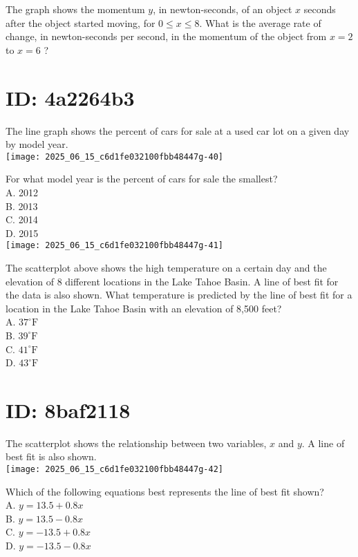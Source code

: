 The graph shows the momentum $y$, in newton-seconds, of an object $x$ seconds after the object started moving, for $0 \leq x \leq 8$. What is the average rate of change, in newton-seconds per second, in the momentum of the object from $x=2$ to $x=6$ ?

\section*{ID: 4a2264b3}
The line graph shows the percent of cars for sale at a used car lot on a given day by model year.\\
\texttt{[image: 2025\_06\_15\_c6d1fe032100fbb48447g-40]}

For what model year is the percent of cars for sale the smallest?\\
A. 2012\\
B. 2013\\
C. 2014\\
D. 2015\\
\texttt{[image: 2025\_06\_15\_c6d1fe032100fbb48447g-41]}

The scatterplot above shows the high temperature on a certain day and the elevation of 8 different locations in the Lake Tahoe Basin. A line of best fit for the data is also shown. What temperature is predicted by the line of best fit for a location in the Lake Tahoe Basin with an elevation of 8,500 feet?\\
A. $37^{\circ} \mathrm{F}$\\
B. $39^{\circ} \mathrm{F}$\\
C. $41^{\circ} \mathrm{F}$\\
D. $43^{\circ} \mathrm{F}$

\section*{ID: 8baf2118}
The scatterplot shows the relationship between two variables, $x$ and $y$. A line of best fit is also shown.\\
\texttt{[image: 2025\_06\_15\_c6d1fe032100fbb48447g-42]}

Which of the following equations best represents the line of best fit shown?\\
A. $y=13.5+0.8 x$\\
B. $y=13.5-0.8 x$\\
C. $y=-13.5+0.8 x$\\
D. $y=-13.5-0.8 x$

